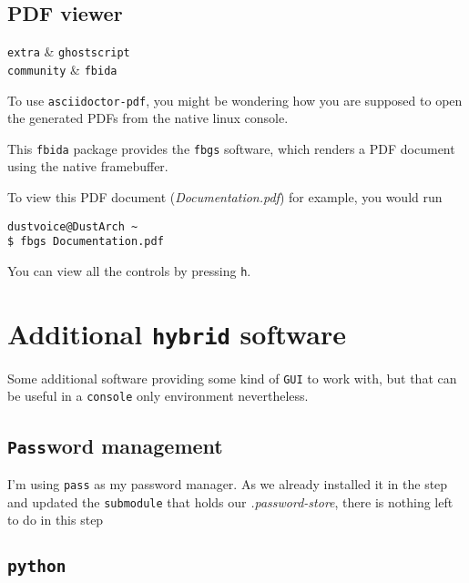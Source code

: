 \documentclass[10pt]{dustdoc}
\begin{document}
\subsection{PDF viewer}
\label{sec:console-pdf-viewer}

\begin{packagetable}
    \texttt{extra} & \texttt{ghostscript} \\ 
    \texttt{community} & \texttt{fbida} \\ 
\end{packagetable}

To use \texttt{asciidoctor-pdf}, you might be wondering how you are supposed to open the generated PDFs from the native linux console.

This \texttt{fbida} package provides the \texttt{fbgs} software, which renders a PDF document using the native framebuffer.

To view this PDF document (\textit{Documentation.pdf}) for example, you would run

\begin{verbatim}
dustvoice@DustArch ~
$ fbgs Documentation.pdf
\end{verbatim}

\begin{NOTE}
    You can view all the controls by pressing \texttt{h}.
\end{NOTE}

\section{Additional \texttt{hybrid} software}
\label{sec:additional-hybrid-software}

Some additional software providing some kind of \texttt{GUI} to work with, but that can be useful in a \texttt{console} only environment nevertheless.

\subsection{\texttt{Pass}word management}
\label{sec:password-management}

I’m using \texttt{pass} as my password manager.
As we already installed it in the  step and updated the \texttt{submodule} that holds our \textit{.password-store}, there is nothing left to do in this step

\subsection{\texttt{python}}
\label{sec:python}
\end{document}
